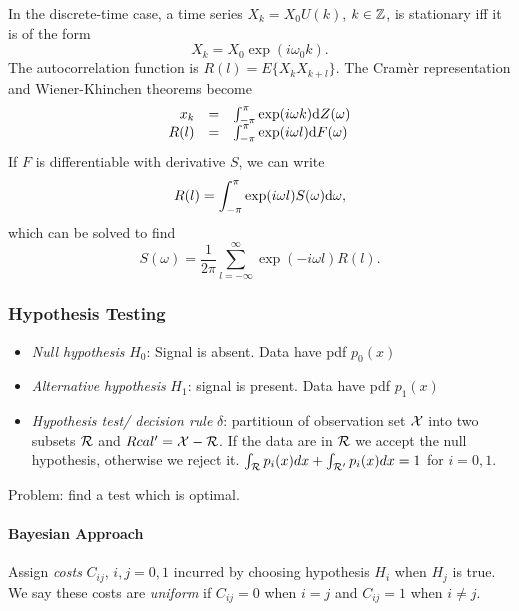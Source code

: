 In the discrete-time case, a time series $X_k=X_0 U(k)$, $k \in \mathbb{Z}$, is stationary iff it is of the form
\begin{equation}
X_k = X_0 \exp(i \omega_0 k).
\end{equation}
The autocorrelation function is $R(l)=E\{X_k X_{k+l} \}$. The Cram\`er representation and Wiener-Khinchen theorems become 
\begin{equation}
\begin{array}{rcl}
x_k & = & \int_{-\pi}^{\pi} \exp(i\omega k ) {\mbox{d}} Z(\omega) \\
R(l) & = & \int_{-\pi}^{\pi} \exp(i\omega l ) {\mbox{d}} F(\omega) 
\end{array}
\end{equation}
If $F$ is differentiable with derivative $S$, we can write
\begin{equation}
R(l)=\int_{-\pi}^{\pi} \exp(i \omega l) S(\omega) {\mbox{d}} \omega,
\end{equation}
which can be solved to find 
\begin{equation}
S(\omega)=\frac{1}{2\pi}\sum_{l=-\infty}^{\infty} \exp(-i\omega l) R(l).
\end{equation}


\subsubsection{Hypothesis Testing}
\begin{itemize}
\item \textit{Null hypothesis} $H_0$: Signal is absent. Data have pdf $p_0(x)$
\item \textit{Alternative hypothesis} $H_1$: signal is present. Data have pdf $p_1(x)$
\item \textit{Hypothesis test/ decision rule} $\delta$: partitioun of observation set $\mathcal{X}$ into two subsets $\mathcal{R}$ and $Rcal'=\mathcal{X}-\mathcal{R}$. If the data are in $\mathcal{R}$ we accept the null hypothesis, otherwise we reject it. $\int_{\mathcal{R}} p_i(x) dx+ \int_{\mathcal{R}'} p_i(x) dx=1$ for $i=0,1$.
\end{itemize}
Problem: find a test which is optimal.

\paragraph{Bayesian Approach}

Assign \textit{costs} $C_{ij}$, $i,j=0,1$ incurred by choosing hypothesis $H_i$ when $H_j$ is true. We say these costs are \textit{uniform} if $C_{ij}=0$ when $i=j$ and $C_{ij}=1$ when $i \neq j$. 

